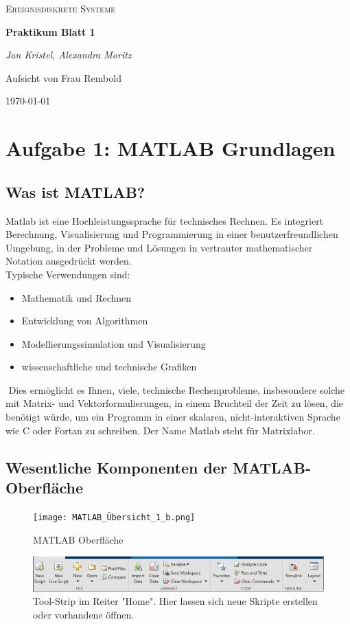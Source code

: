 \documentclass{article}
\begin{document}
	\begin{titlepage}
		\centering
		{\scshape\LARGE
			Ereignisdiskrete Systeme
			\par}
		\vspace{1.5cm}
		{\huge\bfseries Praktikum Blatt 1\par}
		\vspace{1.5cm}
		{\LARGE\itshape Jan Kristel, Alexandra Moritz\par}
		\vfill
			Aufsicht von Frau Rembold\par
			
		\vfill	
			{\large \today \par}	
		
	\end{titlepage}
	
	\tableofcontents
	\newpage
	\section{Aufgabe 1: MATLAB Grundlagen}
		\subsection{Was ist MATLAB?}
		Matlab ist eine Hochleistungssprache für technisches Rechnen. Es integriert Berechnung, Visualisierung und Programmierung in einer benutzerfreundlichen Umgebung, in der Probleme und Lösungen in vertrauter mathematischer Notation ausgedrückt werden. \\
		Typische Verwendungen sind:
		\begin{itemize}
			\item Mathematik und Rechnen
			\item Entwicklung von Algorithmen
			\item Modellierungssimulation und Visualisierung
			\item wissenschaftliche und technische Grafiken
		\end{itemize}
		 Dies ermöglicht es Ihnen, viele, technische Rechenprobleme, insbesondere solche mit Matrix- und Vektorformulierungen, in einem Bruchteil der Zeit zu lösen, die benötigt würde, um ein Programm in einer skalaren, nicht-interaktiven Sprache wie C oder Fortan zu schreiben. Der Name Matlab steht für Matrixlabor.
		\subsection{Wesentliche Komponenten der MATLAB-Oberfläche}
			\begin{figure}[h]
				\texttt{[image: MATLAB\_Übersicht\_1\_b.png]}
				\caption{MATLAB Oberfläche}
				\label{fig2: MATLABOberflaeche}
			\end{figure}
	\newpage
			\begin{figure}
				\includegraphics[scale=0.45]{TOOLStirp.png}
				\caption{Tool-Strip im Reiter "Home". Hier lassen sich neue Skripte erstellen oder vorhandene öffnen.}
				\label{fig3: ToolStrip_Home}
			\end{figure}		
	
\end{document}
